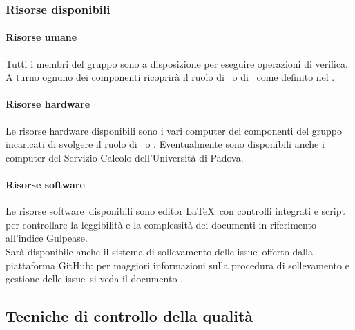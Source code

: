 \documentclass[../PianoDiQualifica.tex]{subfiles}
\begin{document}
		    \subsubsection{Risorse disponibili}
			    \paragraph{Risorse umane}
			    Tutti i membri del gruppo sono a disposizione per eseguire operazioni di verifica. A turno ognuno dei componenti ricoprirà il ruolo di \responsabilediprogetto\ o di \verificatore\ come definito nel \pianodiprogettov.
			    \paragraph{Risorse hardware}
			    Le risorse hardware disponibili sono i vari computer dei componenti del gruppo incaricati di svolgere il ruolo di \responsabilediprogetto\ o \verificatore. Eventualmente sono disponibili anche i computer del Servizio Calcolo dell'Università di Padova.
				\paragraph{Risorse software}
				Le risorse software\g\ disponibili sono editor \LaTeX\g\ con controlli integrati e script per controllare la leggibilità e la complessità dei documenti in riferimento all'indice Gulpease\g.\\
				Sarà disponibile anche il sistema di sollevamento delle issue\g\ offerto dalla piattaforma GitHub\g: per maggiori informazioni sulla procedura di sollevamento e gestione delle issue\g\ 
si veda il documento \normediprogettov.
		\subsection{Tecniche di controllo della qualità}
\end{document}
